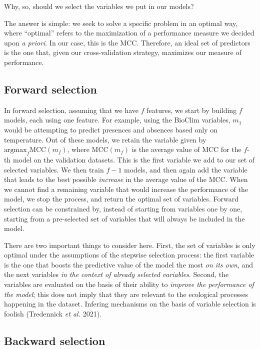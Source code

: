 \documentclass[
  letterpaper,
]{scrbook}
\begin{document}
Why, so, should we select the variables we put in our models?

The answer is simple: we seek to solve a specific problem in an optimal
way, where ``optimal'' refers to the maximization of a performance
measure we decided upon \emph{a priori}. In our case, this is the MCC.
Therefore, an ideal set of predictors is the one that, given our
cross-validation strategy, maximizes our measure of performance.

\subsection{Forward selection}\label{forward-selection}

In forward selection, assuming that we have \(f\) features, we start by
building \(f\) models, each using one feature. For example, using the
BioClim variables, \(m_1\) would be attempting to predict presences and
absences based only on temperature. Out of these models, we retain the
variable given by \(\text{argmax}_f \text{MCC}(m_f)\), where
\(\text{MCC}(m_f)\) is the average value of MCC for the \(f\)-th model
on the validation datasets. This is the first variable we add to our set
of selected variables. We then train \(f-1\) models, and then again add
the variable that leads to the best possible \emph{increase} in the
average value of the MCC. When we cannot find a remaining variable that
would increase the performance of the model, we stop the process, and
return the optimal set of variables. Forward selection can be
constrained by, instead of starting from variables one by one, starting
from a pre-selected set of variables that will always be included in the
model.

There are two important things to consider here. First, the set of
variables is only optimal under the assumptions of the stepwise
selection process: the first variable is the one that boosts the
predictive value of the model the most \emph{on its own}, and the next
variables \emph{in the context of already selected variables}. Second,
the variables are evaluated on the basis of their ability to
\emph{improve the performance of the model}; this does not imply that
they are relevant to the ecological processes happening in the dataset.
Infering mechanisms on the basis of variable selection is foolish
(Tredennick \emph{et al.} 2021).

\subsection{Backward selection}\label{backward-selection}
\end{document}
